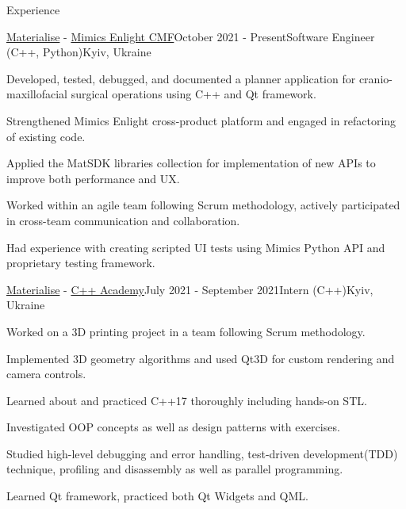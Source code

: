 \documentclass[
	11pt, %
]{resume} %
\begin{document}

\begin{rSection}{Experience}

	\begin{rSubsection}{\href{https://www.materialise.com/en}{\color{blue}Materialise} - \href{https://www.materialise.com/ja/healthcare/mimics-enlight-cmf}{\color{blue}Mimics Enlight CMF}}{October 2021 - Present}{Software Engineer (C++, Python)}{Kyiv, Ukraine}
        \item Developed, tested, debugged, and documented a planner application for cranio-maxillofacial surgical operations using C++ and Qt framework.
        \item Strengthened Mimics Enlight cross-product platform and engaged in refactoring of existing code.
		\item Applied the MatSDK libraries collection for implementation of new APIs to improve both performance and UX.
        \item Worked within an agile team following Scrum methodology, actively participated in cross-team communication and collaboration.
        \item Had experience with creating scripted UI tests using Mimics Python API and proprietary testing framework.
	\end{rSubsection}


    \begin{rSubsection}{\href{https://www.materialise.com/en}{\color{blue}Materialise} - \href{https://www.materialise.com/en/careers/students-graduates/internships}{\color{blue}C++ Academy}}{July 2021 - September 2021}{Intern (C++)}{Kyiv, Ukraine}
        \item Worked on a 3D printing project in a team following Scrum methodology.
        \item Implemented 3D geometry algorithms and used Qt3D for custom rendering and camera controls.
        \item Learned about and practiced C++17 thoroughly including hands-on STL.
        \item Investigated OOP concepts as well as design patterns with exercises.
        \item Studied high-level debugging and error handling, test-driven development(TDD) technique, profiling and disassembly as well as parallel programming.
        \item Learned Qt framework, practiced both Qt Widgets and QML.
    \end{rSubsection}

\end{rSection}
\end{document}
